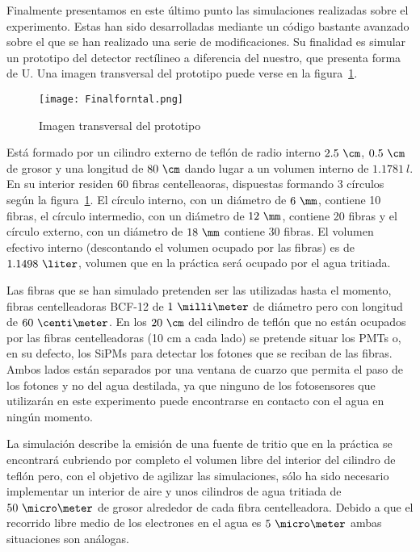 Finalmente presentamos en este último punto las simulaciones realizadas sobre el experimento. Estas han sido desarrolladas mediante un código bastante avanzado sobre el que se han realizado una serie de modificaciones. Su finalidad es simular un prototipo del detector rectílineo a diferencia del nuestro, que presenta forma de U. Una imagen transversal del prototipo puede verse en la figura~\ref{imagenprototiposimulado}.

\begin{figure}[hbtp]
\centering
\texttt{[image: Finalforntal.png]}
\caption{Imagen transversal del prototipo\label{imagenprototiposimulado}}
\end{figure}

Está formado por un cilindro externo de teflón  de radio interno $2.5~\cm$, $0.5~\cm$ de grosor y una longitud de $80~\cm$ dando lugar a un volumen interno de $1.1781~l$. En su interior residen 60 fibras centelleaoras, dispuestas formando 3 círculos según la figura~\ref{imagenprototiposimulado}. El círculo interno, con un diámetro de $6~\mm$, contiene 10 fibras, el círculo intermedio, con un diámetro de $12~\mm$, contiene 20 fibras y el círculo externo, con un diámetro de $18~\mm$ contiene 30 fibras. El volumen efectivo interno (descontando el volumen ocupado por las fibras) es de $1.1498~\liter$, volumen que en la práctica será ocupado por el agua tritiada.

Las fibras que se han simulado pretenden ser las utilizadas hasta el momento, fibras centelleadoras BCF-12 de $1~\milli\meter$ de diámetro pero con longitud de $60~\centi\meter$. En los $20~\cm$  del cilindro de teflón que no están ocupados por las fibras centelleadoras (10 cm a cada lado) se pretende situar los PMTs o, en su defecto, los SiPMs para detectar los fotones que se reciban de las fibras. Ambos lados están separados por una ventana de cuarzo que permita el paso de los fotones y no del agua destilada, ya que ninguno de los fotosensores que utilizarán en este experimento puede encontrarse en contacto con el agua en ningún momento.

La simulación describe la emisión de una fuente de tritio que en la práctica se encontrará cubriendo por completo el volumen libre del interior del cilindro de teflón pero, con el objetivo de agilizar las simulaciones, sólo ha sido necesario implementar un interior de aire y unos cilindros de agua tritiada de $50~\micro\meter$ de grosor alrededor de cada fibra centelleadora. Debido a que el recorrido libre medio de los electrones en el agua es $5~\micro\meter$ ambas situaciones son análogas. 

